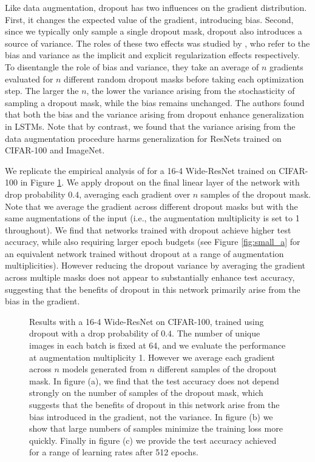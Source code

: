\documentclass{article}
\begin{document}
Like data augmentation, dropout has two influences on the gradient distribution. First, it changes the expected value of the gradient, introducing bias. Second, since we typically only sample a single dropout mask, dropout also introduces a source of variance. The roles of these two effects was studied by \citet{wei2020implicit}, who refer to the bias and variance as the implicit and explicit regularization effects respectively. To disentangle the role of bias and variance, they take an average of $n$ gradients evaluated for $n$ different random dropout masks before taking each optimization step. The larger the $n$, the lower the variance arising from the stochasticity of sampling a dropout mask, while the bias remains unchanged. The authors found that both the bias and the variance arising from dropout enhance generalization in LSTMs. Note that by contrast, we found that the variance arising from the data augmentation procedure harms generalization for ResNets trained on CIFAR-100 and ImageNet.

We replicate the empirical analysis of \citet{wei2020implicit} for a 16-4 Wide-ResNet trained on CIFAR-100 in Figure \ref{fig:dropout}. We apply dropout on the final linear layer of the network with drop probability $0.4$, averaging each gradient over $n$ samples of the dropout mask. Note that we average the gradient across different dropout masks but with the same augmentations of the input (i.e., the augmentation multiplicity is set to 1 throughout). We find that networks trained with dropout achieve higher test accuracy, while also requiring larger epoch budgets (see Figure \ref{fig:small_a} for an equivalent network trained without dropout at a range of augmentation multiplicities). However reducing the dropout variance by averaging the gradient across multiple masks does not appear to substantially enhance test accuracy, suggesting that the benefits of dropout in this network primarily arise from the bias in the gradient.



\begin{figure}[t]
\centering
  \vskip -1mm
  \vskip -2mm
\caption{Results with a 16-4 Wide-ResNet on CIFAR-100, trained using dropout with a drop probability of $0.4$. The number of unique images in each batch is fixed at 64, and we evaluate the performance at augmentation multiplicity 1. However we average each gradient across $n$ models generated from $n$ different samples of the dropout mask. In figure (a), we find that the test accuracy does not depend strongly on the number of samples of the dropout mask, which suggests that the benefits of dropout in this network arise from the bias introduced in the gradient, not the variance. In figure (b) we show that large numbers of samples minimize the training loss more quickly. Finally in figure (c) we provide the test accuracy achieved for a range of learning rates after 512 epochs.}
\label{fig:dropout}
  \vskip -2mm
\end{figure}
\end{document}
